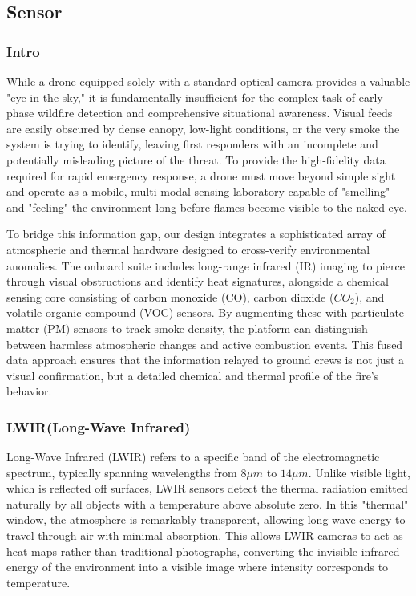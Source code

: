 \documentclass[journal, onecolumn]{IEEEtran}
\begin{document}
\subsection{Sensor}

\subsubsection{Intro}

While a drone equipped solely with a standard optical camera provides a valuable "eye in the sky," it is fundamentally insufficient for the complex task of early-phase wildfire detection and comprehensive situational awareness. Visual feeds are easily obscured by dense canopy, low-light conditions, or the very smoke the system is trying to identify, leaving first responders with an incomplete and potentially misleading picture of the threat. To provide the high-fidelity data required for rapid emergency response, a drone must move beyond simple sight and operate as a mobile, multi-modal sensing laboratory capable of "smelling" and "feeling" the environment long before flames become visible to the naked eye.


To bridge this information gap, our design integrates a sophisticated array of atmospheric and thermal hardware designed to cross-verify environmental anomalies. The onboard suite includes long-range infrared (IR) imaging to pierce through visual obstructions and identify heat signatures, alongside a chemical sensing core consisting of carbon monoxide (CO), carbon dioxide ($CO_2$), and volatile organic compound (VOC) sensors. By augmenting these with particulate matter (PM) sensors to track smoke density, the platform can distinguish between harmless atmospheric changes and active combustion events. This fused data approach ensures that the information relayed to ground crews is not just a visual confirmation, but a detailed chemical and thermal profile of the fire's behavior.

\vspace{1em}

\subsubsection{LWIR(Long-Wave Infrared)}

Long-Wave Infrared (LWIR) refers to a specific band of the electromagnetic spectrum, typically spanning wavelengths from $8 \mu m$ to $14 \mu m$. Unlike visible light, which is reflected off surfaces, LWIR sensors detect the thermal radiation emitted naturally by all objects with a temperature above absolute zero. In this "thermal" window, the atmosphere is remarkably transparent, allowing long-wave energy to travel through air with minimal absorption. This allows LWIR cameras to act as heat maps rather than traditional photographs, converting the invisible infrared energy of the environment into a visible image where intensity corresponds to temperature.
\end{document}
